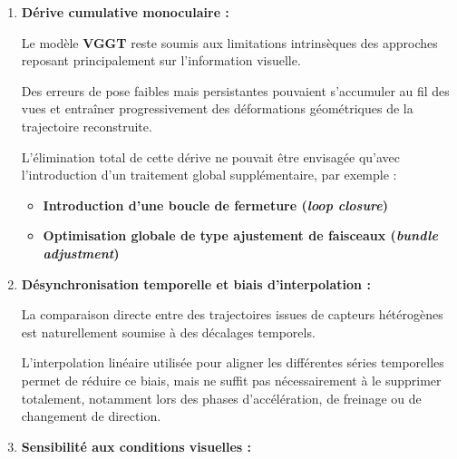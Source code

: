 \documentclass[12pt,a4paper,oneside]{report}
\begin{document}
\begin{enumerate}[itemsep=0.5em]

    \item{\textbf{Dérive cumulative monoculaire :}}\vspace{0.02cm}

    \hspace*{1cm}Le modèle \textbf{VGGT} reste soumis aux limitations intrinsèques des approches reposant principalement sur l'information visuelle. \vspace{0.01cm}

    \hspace*{0.5cm}Des erreurs de pose faibles mais persistantes pouvaient s'accumuler au fil des vues et entraîner progressivement des déformations géométriques de la trajectoire reconstruite.\vspace{0.03cm}

    \hspace*{1cm}L'élimination total de cette dérive ne pouvait être envisagée qu'avec l'introduction d'un traitement global supplémentaire, par exemple :\vspace{0.05cm}

    \begin{itemize}[label=\textbullet, leftmargin=2cm, itemsep=0.5em]
        \item \textbf{Introduction d'une boucle de fermeture (\textit{loop closure})}
        \item \textbf{Optimisation globale de type ajustement de faisceaux (\textit{bundle adjustment})}
    \end{itemize}

\newpage

    \item{\textbf{Désynchronisation temporelle et biais d'interpolation :}}\vspace{0.02cm}

    \hspace*{1cm}La comparaison directe entre des trajectoires issues de capteurs hétérogènes est naturellement soumise à des décalages temporels.\vspace{0.05cm}

    \hspace*{0.5cm}L'interpolation linéaire utilisée pour aligner les différentes séries temporelles permet de réduire ce biais, mais ne suffit pas nécessairement à le supprimer totalement, notamment lors des phases d'accélération, de freinage ou de changement de direction.

    \item{\textbf{Sensibilité aux conditions visuelles :}}\vspace{0.02cm}


\end{enumerate}
\end{document}
